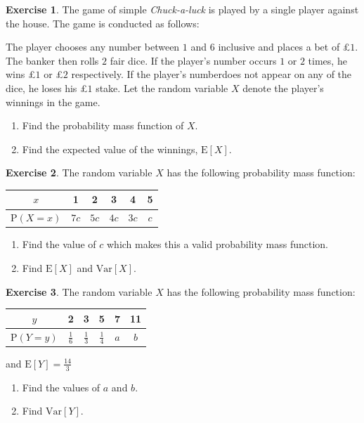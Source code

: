 \documentclass[
]{book}
\theoremstyle{definition}
\theoremstyle{definition}
\theoremstyle{definition}
\newtheorem{exercise}{Exercise}[chapter]
\theoremstyle{definition}
\theoremstyle{remark}
\begin{document}
\begin{exercise}

The game of simple \emph{Chuck-a-luck} is played by a single player against the house. The game is conducted as follows:

The player chooses any number between \(1\) and \(6\) inclusive and places a bet of £\(1\). The banker then rolls \(2\) fair dice. If the player's number occurs \(1\) or \(2\) times, he wins £\(1\) or £\(2\) respectively. If the player's numberdoes not appear on any of the dice, he loses his £\(1\) stake. Let the random variable \(X\) denote the player's winnings in the game.

\begin{enumerate}
\def\labelenumi{\alph{enumi})}
\item
  Find the probability mass function of \(X\).
\item
  Find the expected value of the winnings, \(\text{E}[X]\).
\end{enumerate}

\end{exercise}

\begin{exercise}

The random variable \(X\) has the following probability mass function:

\begin{longtable}[]{@{}cccccc@{}}
\toprule
\(x\) & 1 & 2 & 3 & 4 & 5\tabularnewline
\midrule
\endhead
\(\text{P}(X=x)\) & \(7c\) & \(5c\) & \(4c\) & \(3c\) & \(c\)\tabularnewline
\bottomrule
\end{longtable}

\begin{enumerate}
\def\labelenumi{\alph{enumi})}
\item
  Find the value of \(c\) which makes this a valid probability mass function.
\item
  Find \(\text{E}[X]\) and \(\text{Var}[X]\).
\end{enumerate}

\end{exercise}

\begin{exercise}

The random variable \(X\) has the following probability mass function:

\begin{longtable}[]{@{}cccccc@{}}
\toprule
\(y\) & 2 & 3 & 5 & 7 & 11\tabularnewline
\midrule
\endhead
\(\text{P}(Y=y)\) & \(\frac{1}{6}\) & \(\frac{1}{3}\) & \(\frac{1}{4}\) & \(a\) & \(b\)\tabularnewline
\bottomrule
\end{longtable}

and \(\text{E}[Y]=\frac{14}{3}\)

\begin{enumerate}
\def\labelenumi{\alph{enumi})}
\item
  Find the values of \(a\) and \(b\).
\item
  Find \(\text{Var}[Y]\).
\end{enumerate}

\end{exercise}
\end{document}
